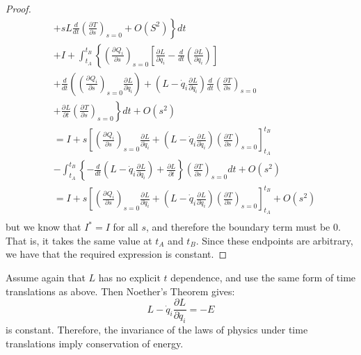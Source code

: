 \documentclass[../Main.tex]{subfiles}
\begin{document}
\begin{proof}
\begin{align*}
        &\left.+ sL\frac{d}{dt}\left(\frac{\partial^{}T}{\partial s^{}}\right)_{s = 0} + O(S^2) \right\} dt \\
        &+ I + \int_{t_A}^{t_B} \left\{ \left(\frac{\partial^{}Q_i}{\partial s^{}}\right)_{s = 0} \left[\frac{\partial^{}L}{\partial q_i^{}} - \frac{d}{dt} \left(\frac{\partial^{}L}{\partial q_i^{}}\right)\right] \right. \\
        &+ \frac{d}{dt} \left(\left(\frac{\partial^{}Q_i}{\partial s^{}}\right)_{s = 0} \frac{\partial^{}L}{\partial q_i^{}}\right) + \left(L - \dot{q}_i \frac{\partial^{}L}{\partial \dot{q}_i^{}}\right)\frac{d}{dt}\left(\frac{\partial^{}T}{\partial s^{}}\right)_{s = 0} \\
        &\left. + \frac{\partial^{}L}{\partial t^{}}\left(\frac{\partial^{}T}{\partial s^{}}\right)_{s = 0} \right\}dt + O(s^2) \\
        &= I + s \left[\left(\frac{\partial^{}Q_i}{\partial s^{}}\right)_{s = 0} \frac{\partial^{}L}{\partial \dot{q}_i^{}} + \left(L - \dot{q}_i \frac{\partial^{}L}{\partial \dot{q}_i^{}}\right) \left(\frac{\partial^{}T}{\partial s^{}}\right)_{s = 0}\right]_{t_A}^{t_B} \\
        &- \int_{t_A}^{t_B} \left\{-\frac{d}{dt}\left(L - \dot{q}_i \frac{\partial^{}L}{\partial \dot{q}_i^{}}\right) + \frac{\partial L}{\partial t}\right\} \left(\frac{\partial^{}T}{\partial s^{}}\right)_{s = 0} dt + O(s^2) \\
        &= I + s \left[\left(\frac{\partial^{}Q_i}{\partial s^{}}\right)_{s = 0} \frac{\partial^{}L}{\partial \dot{q}_i^{}} + \left(L - \dot{q}_i \frac{\partial^{}L}{\partial \dot{q}_i^{}}\right) \left(\frac{\partial^{}T}{\partial s^{}}\right)_{s = 0}\right]_{t_A}^{t_B} + O(s^2) \\
    \end{align*}
    but we know that $I^* = I$ for all $s$, and therefore the boundary term must be 0. That is, it takes the same value at $t_A$ and $t_B$. Since these endpoints are arbitrary, we have that the required expression is constant.
\end{proof}
\begin{example}
    Assume again that $L$ has no explicit $t$ dependence, and use the same form of time translations as above. Then Noether's Theorem gives:
    \begin{equation*}
        L - \dot{q}_i \frac{\partial L}{\partial \dot{q}_i} = -E
    \end{equation*}
    is constant. Therefore, the invariance of the laws of physics under time translations imply conservation of energy.
\end{example}
\end{document}
